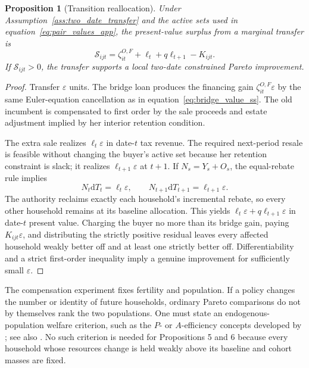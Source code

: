 \documentclass[11pt]{article}
\newtheorem{proposition}{Proposition}
\theoremstyle{definition}
\theoremstyle{remark}
\newcommand{\dd}{\mathrm d}
\newcommand{\mcS}{\mathcal S}
\begin{document}
\begin{proposition}[Transition reallocation]
Under Assumption~\ref{ass:two_date_transfer} and the active sets used in
equation~\eqref{eq:pair_values_app}, the present-value surplus from a marginal
transfer is
\begin{equation}
 \mcS_{ijt}=\zeta_{it}^{O,F}+\ell_t+q\ell_{t+1}-K_{ijt}.
 \label{eq:transition_surplus_app}
\end{equation}
If $\mcS_{ijt}>0$, the transfer supports a local two-date constrained Pareto
improvement.
\end{proposition}

\begin{proof}
Transfer $\varepsilon$ units.  The bridge loan produces the financing gain
$\zeta_{it}^{O,F}\varepsilon$ by the same Euler-equation cancellation as in
equation~\eqref{eq:bridge_value_ss}.  The old incumbent is compensated to first
order by the sale proceeds and estate adjustment implied by her interior
retention condition.

The extra sale realizes $\ell_t\varepsilon$ in date-$t$ tax revenue.  The
required next-period resale is feasible without changing the buyer's active set
because her retention constraint is slack; it realizes
$\ell_{t+1}\varepsilon$ at $t+1$.  If $N_s=Y_s+O_s$, the equal-rebate rule
implies
\begin{equation}
 N_t\dd T_t=\ell_t\varepsilon,
 \qquad
 N_{t+1}\dd T_{t+1}=\ell_{t+1}\varepsilon.
 \label{eq:incremental_rebates}
\end{equation}
The authority reclaims exactly each household's incremental rebate, so every
other household remains at its baseline allocation.  This yields
$\ell_t\varepsilon+q\ell_{t+1}\varepsilon$ in date-$t$ present value.  Charging
the buyer no more than its bridge gain, paying $K_{ijt}\varepsilon$, and
distributing the strictly positive residual leaves every affected household
weakly better off and at least one strictly better off.  Differentiability and
a strict first-order inequality imply a genuine improvement for sufficiently
small $\varepsilon$.
\end{proof}

The compensation experiment fixes fertility and population.  If a policy
changes the number or identity of future households, ordinary Pareto comparisons
do not by themselves rank the two populations.  One must state an
endogenous-population welfare criterion, such as the $P$- or $A$-efficiency
concepts developed by \cite{golosovjonestertilt2007}; see also
\cite{pereznievasetal2019}.  No such criterion is needed for Propositions 5 and 6
because every household whose resources change is held weakly above its
baseline and cohort masses are fixed.
\end{document}
